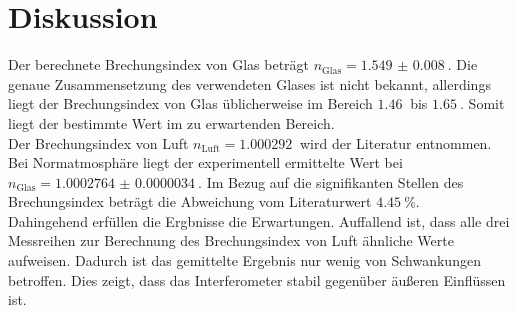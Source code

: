 \section{Diskussion}
\label{sec:Diskussion}

Der berechnete Brechungsindex von Glas beträgt $n_\text{Glas} = \qty{1.549(8)}{}$.
Die genaue Zusammensetzung des verwendeten Glases ist nicht bekannt, allerdings liegt der Brechungsindex von Glas üblicherweise im Bereich $\qty{1.46}{}$ bis $\qty{1.65}{}$.\cite{index}
Somit liegt der bestimmte Wert im zu erwartenden Bereich.
\\
Der Brechungsindex von Luft $n_\text{Luft} = \qty{1.000292}{}$ wird der Literatur entnommen. \cite{index}
Bei Normatmosphäre liegt der experimentell ermittelte Wert bei $n_\text{Glas} = \qty{1.0002764(34)}{}$.
Im Bezug auf die signifikanten Stellen des Brechungsindex beträgt die Abweichung vom Literaturwert $\qty{4.45}{\percent}$.
\\
Dahingehend erfüllen die Ergbnisse die Erwartungen. 
Auffallend ist, dass alle drei Messreihen zur Berechnung des Brechungsindex von Luft ähnliche Werte aufweisen.
Dadurch ist das gemittelte Ergebnis nur wenig von Schwankungen betroffen.
Dies zeigt, dass das Interferometer stabil gegenüber äußeren Einflüssen ist.